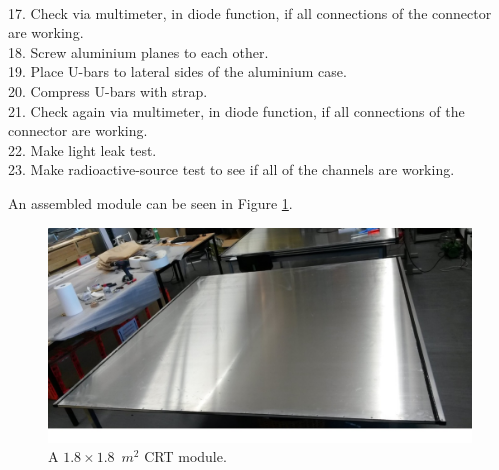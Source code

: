 \documentclass[a4paper]{article}\linespread{1.4}
\begin{document}
\\17.	Check via multimeter, in diode function, if all connections of the connector are working.
\\18.	Screw aluminium planes to each other.
\\19.	Place U-bars to lateral sides of the aluminium case.
\\20.	Compress U-bars with strap. 
\\21.	Check again via multimeter, in diode function, if all connections of the connector are working.
\\22.	Make light leak test.
\\23.	Make radioactive-source test to see if all of the channels are working. 

An assembled module can be seen in Figure \ref{fig:ass}.
\begin{figure}[h!] \hspace*{-0.5cm} \includegraphics[width=135mm,scale=2.0]{figures/a1paint.jpg} \caption{A $1.8\times 1.8$~$m^{2}$ CRT module.} \label{fig:ass}\end{figure}



\end{document}
